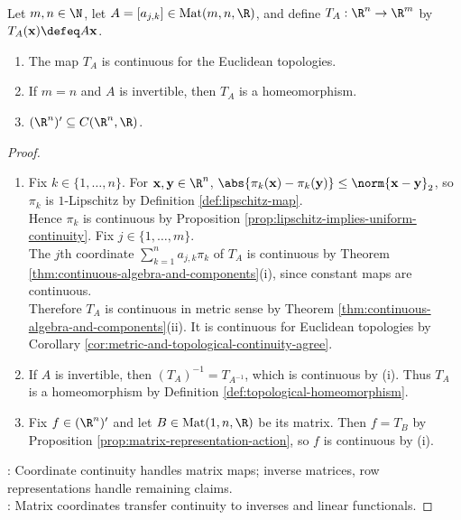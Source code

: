 \begin{proposition} \label{prop:real-matrix-maps-continuous-homeomorphisms} \\
Let $m,n\in\N$, let $A=[a_{j,k}]\in\operatorname{Mat}(m,n,\R)$, and define $T_A:\R^n\to\R^m$ by $T_A(\mathbf{x})\defeq A\mathbf{x}$.
\begin{enumerate}[label=(\roman*)]
\setlength{\itemsep}{0pt}
\item The map $T_A$ is continuous for the Euclidean topologies.
\item If $m=n$ and $A$ is invertible, then $T_A$ is a homeomorphism.
\item $(\R^n)'\subseteq C(\R^n,\R)$.
\end{enumerate}
\begin{proof}
\begin{enumerate}[label=(\roman*)]
\setlength{\itemsep}{0pt}
\item Fix $k\in\{1,\ldots,n\}$. For $\mathbf{x},\mathbf{y}\in\R^n$, $\abs{\pi_k(\mathbf{x})-\pi_k(\mathbf{y})}\leq\norm{\mathbf{x}-\mathbf{y}}_2$, so $\pi_k$ is $1$-Lipschitz by Definition \ref{def:lipschitz-map}.\\
Hence $\pi_k$ is continuous by Proposition \ref{prop:lipschitz-implies-uniform-continuity}. Fix $j\in\{1,\ldots,m\}$.\\
The $j$th coordinate $\sum\limits_{k=1}^n a_{j,k}\pi_k$ of $T_A$ is continuous by Theorem \ref{thm:continuous-algebra-and-components}(i), since constant maps are continuous.\\
Therefore $T_A$ is continuous in metric sense by Theorem \ref{thm:continuous-algebra-and-components}(ii). It is continuous for Euclidean topologies by Corollary \ref{cor:metric-and-topological-continuity-agree}.
\item If $A$ is invertible, then $(T_A)^{-1}=T_{A^{-1}}$, which is continuous by (i). Thus $T_A$ is a homeomorphism by Definition \ref{def:topological-homeomorphism}.
\item Fix $f\in(\R^n)'$ and let $B\in\operatorname{Mat}(1,n,\R)$ be its matrix. Then $f=T_B$ by Proposition \ref{prop:matrix-representation-action}, so $f$ is continuous by (i).
\end{enumerate}
: Coordinate continuity handles matrix maps; inverse matrices,  row representations handle remaining claims.\\
: Matrix coordinates transfer continuity to inverses and linear functionals.
\end{proof}
\end{proposition}

